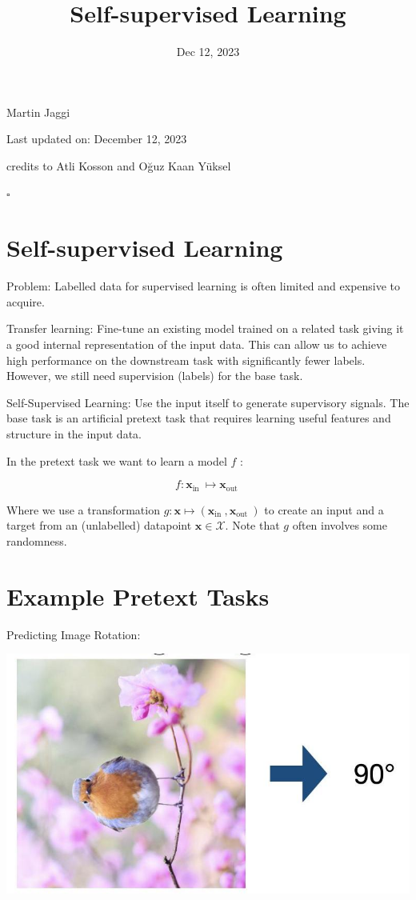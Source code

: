 \documentclass[10pt]{article}
\title{Self-supervised Learning }
\author{Dec 12, 2023}
\date{}
\begin{document}
\maketitle


Martin Jaggi

Last updated on: December 12, 2023

credits to Atli Kosson and Oğuz Kaan Yüksel

$\square$

\section*{Self-supervised Learning}
Problem: Labelled data for supervised learning is often limited and expensive to acquire.

Transfer learning: Fine-tune an existing model trained on a related task giving it a good internal representation of the input data. This can allow us to achieve high performance on the downstream task with significantly fewer labels. However, we still need supervision (labels) for the base task.

Self-Supervised Learning: Use the input itself to generate supervisory signals. The base task is an artificial pretext task that requires learning useful features and structure in the input data.

In the pretext task we want to learn a model $f$ :

$$
f: \mathbf{x}_{\text {in }} \mapsto \mathbf{x}_{\text {out }}
$$

Where we use a transformation $g: \mathbf{x} \mapsto\left(\mathbf{x}_{\text {in }}, \mathbf{x}_{\text {out }}\right)$ to create an input and a target from an (unlabelled) datapoint $\mathbf{x} \in \mathcal{X}$. Note that $g$ often involves some randomness.

\section*{Example Pretext Tasks}
Predicting Image Rotation:

\begin{center}
\includegraphics[max width=\textwidth]{2024_01_08_7c14f4867d7823fc5a52g-03}
\end{center}
\end{document}
